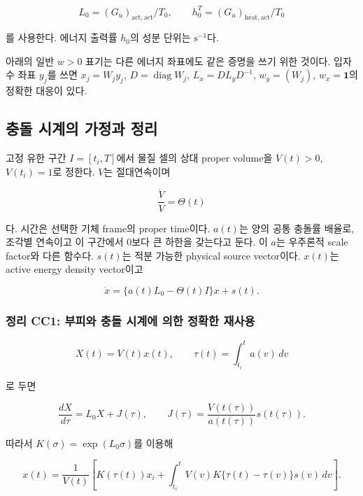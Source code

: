 \documentclass[11pt,a4paper]{article}
\begin{document}
\[
L_0=(G_u)_{\mathrm{act},\mathrm{act}}/T_0,\qquad
h_0^T=(G_u)_{\mathrm{heat},\mathrm{act}}/T_0
\tag{1.3}
\]

를 사용한다. 에너지 출력률 \(h_0\)의 성분 단위는 \(\mathrm{s^{-1}}\)다.

아래의 일반 \(w>0\) 표기는 다른 에너지 좌표에도 같은 증명을 쓰기 위한 것이다. 입자수 좌표 \(y_j\)를 쓰면 \(x_j=W_jy_j\), \(D=\operatorname{diag}W_j\), \(L_x=DL_yD^{-1}\), \(w_y=(W_j)\), \(w_x=\mathbf1\)의 정확한 대응이 있다.

\hypertarget{uxcda9uxb3cc-uxc2dcuxacc4uxc758-uxac00uxc815uxacfc-uxc815uxb9ac}{%
\subsection{충돌 시계의 가정과 정리}\label{uxcda9uxb3cc-uxc2dcuxacc4uxc758-uxac00uxc815uxacfc-uxc815uxb9ac}}

고정 유한 구간 \(I=[t_i,T]\)에서 물질 셀의 상대 proper volume을 \(V(t)>0\), \(V(t_i)=1\)로 정한다. \(V\)는 절대연속이며

\[
\frac{\dot V}{V}=\Theta(t)
\tag{2.1}
\]

다. 시간은 선택한 기체 frame의 proper time이다. \(a(t)\)는 양의 공통 충돌률 배율로, 조각별 연속이고 이 구간에서 0보다 큰 하한을 갖는다고 둔다. 이 \(a\)는 우주론적 scale factor와 다른 함수다. \(s(t)\)는 적분 가능한 physical source vector이다. \(x(t)\)는 active energy density vector이고

\[
\dot x=\{a(t)L_0-\Theta(t)I\}x+s(t).
\tag{2.2}
\]

\hypertarget{uxc815uxb9ac-cc1-uxbd80uxd53cuxc640-uxcda9uxb3cc-uxc2dcuxacc4uxc5d0-uxc758uxd55c-uxc815uxd655uxd55c-uxc7acuxc0acuxc6a9}{%
\subsubsection{정리 CC1: 부피와 충돌 시계에 의한 정확한 재사용}\label{uxc815uxb9ac-cc1-uxbd80uxd53cuxc640-uxcda9uxb3cc-uxc2dcuxacc4uxc5d0-uxc758uxd55c-uxc815uxd655uxd55c-uxc7acuxc0acuxc6a9}}

\[
X(t)=V(t)x(t),\qquad
\tau(t)=\int_{t_i}^{t}a(v)\,dv
\tag{2.3}
\]

로 두면

\[
\boxed{
\frac{dX}{d\tau}=L_0X+J(\tau),\qquad
J(\tau)=\frac{V(t(\tau))}{a(t(\tau))}s(t(\tau)).
}
\tag{2.4}
\]

따라서 \(K(\sigma)=\exp(L_0\sigma)\)를 이용해

\[
\boxed{
x(t)=\frac1{V(t)}
\left[
K(\tau(t))x_i+
\int_{t_i}^{t}V(v)K\{\tau(t)-\tau(v)\}s(v)\,dv
\right].
}
\tag{2.5}
\]
\end{document}
